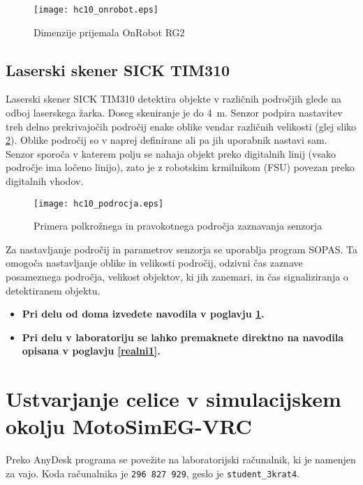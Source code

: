 \begin{figure}[!hbt]
	\centering
	\texttt{[image: hc10\_onrobot.eps]}
	\caption{Dimenzije prijemala OnRobot RG2}
	\label{fig:hc10_onrobot}
\end{figure}


\subsection{Laserski skener SICK TIM310}

Laserski skener SICK TIM310 detektira objekte v različnih področjih glede na odboj laserskega žarka. Doseg skeniranje je do 4~m. Senzor podpira nastavitev treh delno prekrivajočih področij enake oblike vendar različnih velikosti (glej sliko \ref{fig:hc10_sick}). Oblike področij so  v naprej definirane ali pa jih uporabnik nastavi sam. Senzor sporoča v katerem polju se nahaja objekt preko digitalnih linij (vsako področje ima ločeno linijo), zato je z robotskim krmilnikom (FSU) povezan preko digitalnih vhodov.

\begin{figure}[!hbt]
	\centering
	\texttt{[image: hc10\_podrocja.eps]}
	\caption{Primera polkrožnega in pravokotnega področja zaznavanja senzorja}
	\label{fig:hc10_sick}
\end{figure}

Za nastavljanje področij in parametrov senzorja se uporablja program SOPAS. Ta omogoča nastavljanje oblike in velikosti področij, odzivni čas zaznave posameznega področja, velikost objektov, ki jih zanemari, in čas signaliziranja o detektiranem objektu.

\begin{mdframed}[backgroundcolor=red!20, shadow=true,roundcorner=8pt]
	\begin{itemize}
		\item \textbf{Pri delu od doma izvedete navodila v poglavju \ref{sim0}.}
		\item \textbf{Pri delu v laboratoriju se lahko premaknete direktno na navodila opisana v poglavju \ref{realni1}.}		
	\end{itemize}
\end{mdframed}

\section{Ustvarjanje celice v simulacijskem okolju MotoSimEG-VRC} \label{sim0}

Preko AnyDesk programa se povežite na laboratorijski računalnik, ki je namenjen za vajo. Koda računalnika je \verb|296 827 929|, geslo je \verb|student_3krat4|.

